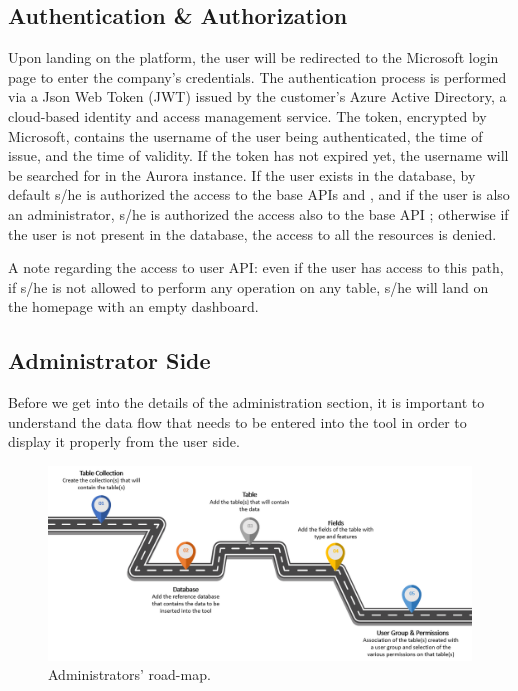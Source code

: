 \subsection*{Authentication \& Authorization}
Upon landing on the platform, the user will be redirected to the Microsoft login page to enter the company's credentials.
The authentication process is performed via a Json Web Token (JWT) issued by the customer's Azure Active Directory, a cloud-based identity and access management service. The token, encrypted by Microsoft, contains the username of the user being authenticated, the time of issue, and the time of validity. If the token has not expired yet, the username will be searched for in the Aurora instance. If the user exists in the database, by default s/he is authorized the access to the base APIs  and , and if the user is also an administrator, s/he is authorized the access also to the base API ; otherwise if the user is not present in the database, the access to all the resources is denied.

A note regarding the access to user API: even if the user has access to this path, if s/he is not allowed to perform any operation on any table, s/he will land on the homepage with an empty dashboard.


\subsection*{Administrator Side}

Before we get into the details of the administration section, it is important to understand the data flow that needs to be entered into the tool in order to display it properly from the user side. 


\begin{figure}[!htb]
    \centering
    \includegraphics[width=15.8cm]{chapters/images/ch_3/BE_roadmap.png}
    \caption{Administrators' road-map.}
    \label{fig:BE_roadmap}
\end{figure}

